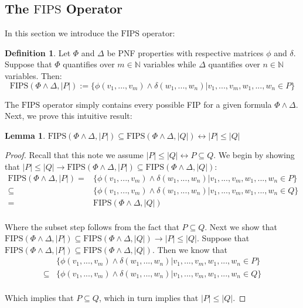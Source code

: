\documentclass[12pt]{article}
\theoremstyle{definition}
\newtheorem{lemma}{Lemma}
\newtheorem{definition}{Definition}
\theoremstyle{remark}
\newcommand{\fips}{\text{FIPS}}
\begin{document}
\subsection{The $\fips$ Operator}

In this section we introduce the $\fips$ operator:
\begin{definition}
  Let $\Phi$ and $\Delta$ be PNF properties with respective matrices $\phi$ and $\delta$.  Suppose that $\Phi$ quantifies over $m \in \mathbb{N}$ variables while $\Delta$ quantifies over $n \in \mathbb{N}$ variables.  Then:
  $$\fips(\Phi \land \Delta, |P|) := \{\phi(v_1,...,v_m) \land \delta(w_1,...,w_n) | v_1,...,v_m,w_1,...,w_n \in P\}$$
\end{definition}

The $\fips$ operator simply contains every possible FIP for a given formula $\Phi \land \Delta$.  Next, we prove this intuitive result:

\begin{lemma}
  \label{lem:fips-subset}
  $\fips(\Phi \land \Delta, |P|) \subseteq \fips(\Phi \land \Delta, |Q|) \leftrightarrow |P| \leq |Q|$
\end{lemma}
\begin{proof}
  Recall that this note we assume $|P| \leq |Q| \leftrightarrow P \subseteq Q$.  We begin by showing that $|P| \leq |Q| \rightarrow \fips(\Phi \land \Delta, |P|) \subseteq \fips(\Phi \land \Delta, |Q|)$:
  \begin{align*}
    \fips(\Phi \land \Delta, |P|) = &\{\phi(v_1,...,v_m) \land \delta(w_1,...,w_n) | v_1,...,v_m,w_1,...,w_n \in P\}\\
    \subseteq &\{\phi(v_1,...,v_m) \land \delta(w_1,...,w_n) | v_1,...,v_m,w_1,...,w_n \in Q\}\\
    = &\fips(\Phi \land \Delta, |Q|)\\
  \end{align*}

  Where the subset step follows from the fact that $P \subseteq Q$.  Next we show that $\fips(\Phi \land \Delta, |P|) \subseteq \fips(\Phi \land \Delta, |Q|) \rightarrow |P| \leq |Q|$.  Suppose that $\fips(\Phi \land \Delta, |P|) \subseteq \fips(\Phi \land \Delta, |Q|)$.  Then we know that 
  \begin{align*}
    &\{\phi(v_1,...,v_m) \land \delta(w_1,...,w_n) | v_1,...,v_m,w_1,...,w_n \in P\}\\
    \subseteq &\{\phi(v_1,...,v_m) \land \delta(w_1,...,w_n) | v_1,...,v_m,w_1,...,w_n \in Q\}\\
  \end{align*}

  Which implies that $P \subseteq Q$, which in turn implies that $|P| \leq |Q|$.

\end{proof}
\end{document}

